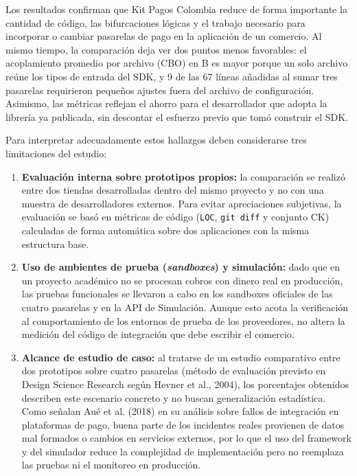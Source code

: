 Los resultados confirman que Kit Pagos Colombia reduce de forma importante la cantidad de código, las bifurcaciones lógicas y el trabajo necesario para incorporar o cambiar pasarelas de pago en la aplicación de un comercio. Al mismo tiempo, la comparación deja ver dos puntos menos favorables: el acoplamiento promedio por archivo (CBO) en B es mayor porque un solo archivo reúne los tipos de entrada del SDK, y 9 de las 67 líneas añadidas al sumar tres pasarelas requirieron pequeños ajustes fuera del archivo de configuración. Asimismo, las métricas reflejan el ahorro para el desarrollador que adopta la librería ya publicada, sin descontar el esfuerzo previo que tomó construir el SDK.

Para interpretar adecuadamente estos hallazgos deben considerarse tres limitaciones del estudio:
\begin{enumerate}
    \item \textbf{Evaluación interna sobre prototipos propios:} la comparación se realizó entre dos tiendas desarrolladas dentro del mismo proyecto y no con una muestra de desarrolladores externos. Para evitar apreciaciones subjetivas, la evaluación se basó en métricas de código (\texttt{LOC}, \texttt{git diff} y conjunto CK) calculadas de forma automática sobre dos aplicaciones con la misma estructura base.
    \item \textbf{Uso de ambientes de prueba (\textit{sandboxes}) y simulación:} dado que en un proyecto académico no se procesan cobros con dinero real en producción, las pruebas funcionales se llevaron a cabo en los sandboxes oficiales de las cuatro pasarelas y en la API de Simulación. Aunque esto acota la verificación al comportamiento de los entornos de prueba de los proveedores, no altera la medición del código de integración que debe escribir el comercio.
    \item \textbf{Alcance de estudio de caso:} al tratarse de un estudio comparativo entre dos prototipos sobre cuatro pasarelas (método de evaluación previsto en Design Science Research según Hevner et al., 2004), los porcentajes obtenidos describen este escenario concreto y no buscan generalización estadística. Como señalan Aué et al. (2018) en su análisis sobre fallos de integración en plataformas de pago, buena parte de los incidentes reales provienen de datos mal formados o cambios en servicios externos, por lo que el uso del framework y del simulador reduce la complejidad de implementación pero no reemplaza las pruebas ni el monitoreo en producción.
\end{enumerate}

